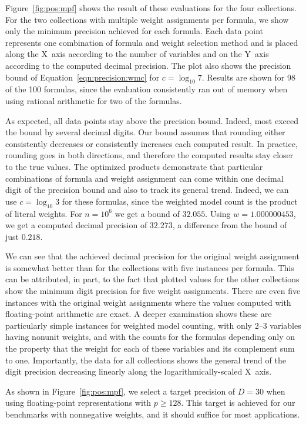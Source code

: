\documentclass{easychair}
\begin{document}
Figure~\ref{fig:pos:mpf} shows the result of these evaluations for
the four collections.  For the two collections with multiple weight assignments per formula,
we show only the minimum precision achieved for each formula.
Each data point
represents one combination of formula and weight selection method and is placed
along the X~axis according to the number of variables
and on the Y~axis according to the computed decimal precision.
The plot also shows the precision bound of Equation~\ref{eqn:precision:wmc} for $c=\log_{10} 7$.
Results are shown for 98 of the 100 formulas, since the evaluation consistently ran out of memory when using rational arithmetic for two of the formulas.

As  expected, all data points stay above the precision bound.
Indeed, most exceed the bound by several decimal digits.  Our bound
assumes that rounding either consistently decreases or consistently
increases each computed result.  In practice, rounding goes in both
directions, and therefore the computed results stay closer to the true
values.  The optimized products demonstrate that particular
combinations of formula and weight assignment can come within one
decimal digit of the precision bound and also to track its general
trend.  Indeed, we can use $c = \log_{10} 3$ for these formulas,
since the weighted model count is the product of literal weights.
For $n=10^6$ we get a bound of $32.055$.
Using $w=1.000000453$, we get
a computed decimal precision of $32.273$, a difference from the bound of just $0.218$.

We can see that the achieved decimal precision for the original weight
assignment is somewhat better than for the collections with five
instances per formula.  This can be attributed, in part, to the fact
that plotted values for the other collections show the minimum digit
precision for five weight assignments.  There are even five instances
with the original weight assignments where the values computed with
floating-point arithmetic are exact.  A deeper examination shows these
are particularly simple instances for weighted model counting, with
only 2--3 variables having nonunit weights, and with the counts for
the formulas depending only on the property that the weight for each
of these variables and its complement sum to one.  Importantly, the
data for all collections shows the general trend of the digit
precision decreasing linearly along the logarithmically-scaled X~axis.

As shown in Figure~\ref{fig:pos:mpf}, we select a target precision of
$D=30$ when using floating-point representations with $p \geq 128$.
This target is achieved for our benchmarks with nonnegative weights,
and it should suffice for most applications.
\end{document}
